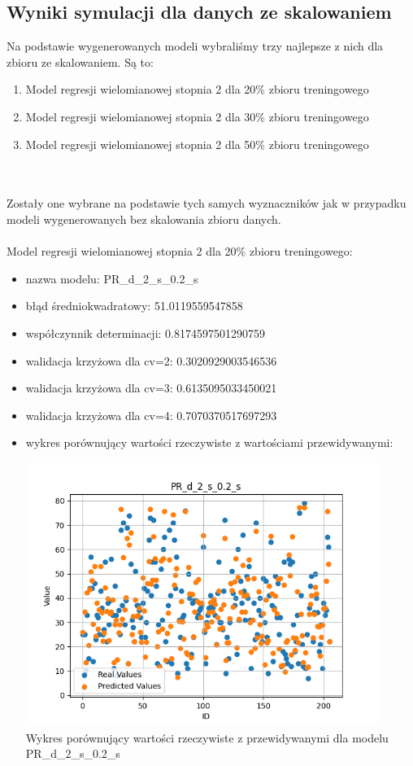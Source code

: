 \documentclass[11pt, a4paper, notitlepage]{report}
\begin{document}
\subsection{Wyniki symulacji dla danych ze skalowaniem}
Na podstawie wygenerowanych modeli wybraliśmy trzy najlepsze z nich dla zbioru ze skalowaniem. Są to:
\begin{enumerate}
	\item Model regresji wielomianowej stopnia 2 dla 20\% zbioru treningowego
	\item Model regresji wielomianowej stopnia 2 dla 30\% zbioru treningowego
	\item Model regresji wielomianowej stopnia 2 dla 50\% zbioru treningowego
\end{enumerate}
\\ \\
Zostały one wybrane na podstawie tych samych wyznaczników jak w przypadku modeli wygenerowanych bez skalowania zbioru danych.
\\ \\
Model regresji wielomianowej stopnia 2 dla 20\% zbioru treningowego:
\begin{itemize}
	\item nazwa modelu: PR\_d\_2\_s\_0.2\_s
	\item błąd średniokwadratowy: 51.0119559547858
	\item współczynnik determinacji: 0.8174597501290759
	\item walidacja krzyżowa dla cv=2: 0.3020929003546536
	\item walidacja krzyżowa dla cv=3: 0.6135095033450021
	\item walidacja krzyżowa dla cv=4: 0.7070370517697293
	\item wykres porównujący wartości rzeczywiste z wartościami przewidywanymi: \begin{center} \small
		\includegraphics[width=0.9\textwidth]{graphics/plots/PR_d_2_s_0.2_s.png} \\
		\caption{Wykres porównujący wartości rzeczywiste z przewidywanymi dla modelu PR\_d\_2\_s\_0.2\_s}
	\end{center}
\end{itemize}
\end{document}
